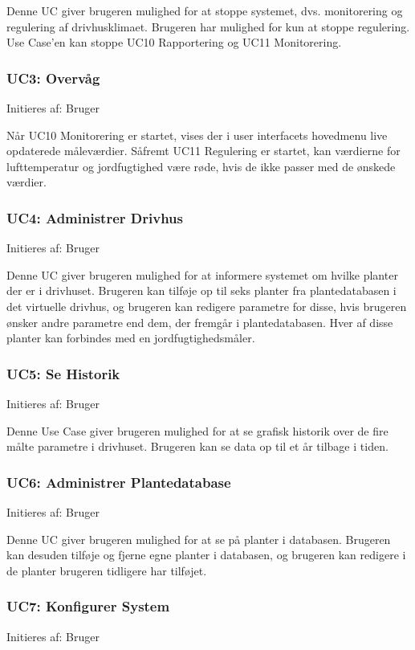 Denne UC giver brugeren mulighed for at stoppe systemet, dvs. monitorering og regulering af drivhusklimaet. 
Brugeren har mulighed for kun at stoppe regulering. Use Case’en kan stoppe UC10 Rapportering og UC11 Monitorering.

\subsubsection{UC3: Overvåg}
Initieres af: Bruger

Når UC10 Monitorering er startet, vises der i user interfacets hovedmenu live opdaterede måleværdier. 
Såfremt UC11 Regulering er startet, kan værdierne for lufttemperatur og jordfugtighed være røde, hvis de ikke passer med de ønskede værdier.

\subsubsection{UC4: Administrer Drivhus}
Initieres af: Bruger

Denne UC giver brugeren mulighed for at informere systemet om hvilke planter der er i drivhuset. 
Brugeren kan tilføje op til seks planter fra plantedatabasen i det virtuelle drivhus, og brugeren kan redigere parametre for disse, hvis brugeren ønsker andre parametre end dem, der fremgår i plantedatabasen. 
Hver af disse planter kan forbindes med en jordfugtighedsmåler. 

\subsubsection{UC5: Se Historik}
Initieres af: Bruger

Denne Use Case giver brugeren mulighed for at se grafisk historik over de fire målte parametre i drivhuset. 
Brugeren kan se data op til et år tilbage i tiden. 

\subsubsection{UC6: Administrer Plantedatabase}
Initieres af: Bruger

Denne UC giver brugeren mulighed for at se på planter i databasen. 
Brugeren kan desuden tilføje og fjerne egne planter i databasen, og brugeren kan redigere i de planter brugeren tidligere har tilføjet. 

\clearpage

\subsubsection{UC7: Konfigurer System}
Initieres af: Bruger

